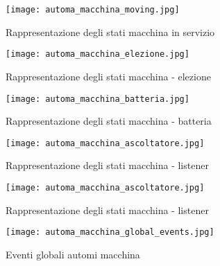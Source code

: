 \begin{figure}[htbp]
	\centering
	\texttt{[image: automa\_macchina\_moving.jpg]}
	\caption{Rappresentazione degli stati macchina in servizio}
	\label{fig:automa_moving}
\end{figure}

\begin{figure}[htbp]
	\centering
	\texttt{[image: automa\_macchina\_elezione.jpg]}
	\caption{Rappresentazione degli stati macchina - elezione}
	\label{fig:automa_elezione}
\end{figure}

\begin{figure}[htbp]
	\centering
	\texttt{[image: automa\_macchina\_batteria.jpg]}
	\caption{Rappresentazione degli stati macchina - batteria}
	\label{fig:automa_batteria}
\end{figure}

\begin{figure}[htbp]
	\centering
	\texttt{[image: automa\_macchina\_ascoltatore.jpg]}
	\caption{Rappresentazione degli stati macchina - listener}
	\label{fig:automa_listener}
\end{figure}

\begin{figure}[htbp]
	\centering
	\texttt{[image: automa\_macchina\_ascoltatore.jpg]}
	\caption{Rappresentazione degli stati macchina - listener}
	\label{fig:automa_listener_2}
\end{figure}

\begin{figure}[htbp]
	\centering
	\texttt{[image: automa\_macchina\_global\_events.jpg]}
	\caption{Eventi globali automi macchina}
	\label{fig:automi_macchina_various}
\end{figure}
